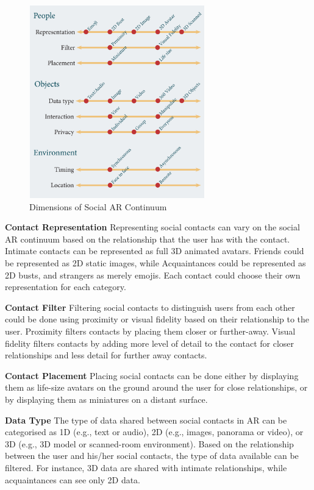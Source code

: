 

\begin{figure}
    \centering
    \includegraphics[width=3in]{images/continuum.eps}
    \caption{Dimensions of Social AR Continuum}
    \label{fig:continuum:dimensions}
\end{figure}

\textbf{Contact Representation}
Representing social contacts can vary on the social AR continuum based on the relationship that the user has with the contact. Intimate contacts can be represented as full 3D animated avatars. Friends could be represented as 2D static images, while Acquaintances could be represented as 2D busts, and strangers as merely emojis. Each contact could choose their own representation for each category.  

\textbf{Contact Filter}
Filtering social contacts to distinguish users from each other could be done using proximity or visual fidelity based on their relationship to the user. Proximity filters contacts by placing them closer or further-away. Visual fidelity filters contacts by adding more level of detail to the contact for closer relationships and less detail for further away contacts. 

\textbf{Contact Placement}
Placing social contacts can be done either by displaying them as life-size avatars on the ground around the user for close relationships, or by displaying them as miniatures on a distant surface. 

\textbf{Data Type}
The type of data shared between social contacts in AR can be categorised as 1D (e.g., text or audio), 2D (e.g., images, panorama or video), or 3D (e.g., 3D model or scanned-room environment). Based on the relationship between the user and his/her social contacts, the type of data available can be filtered. For instance, 3D data are shared with intimate relationships, while acquaintances can see only 2D data.  


